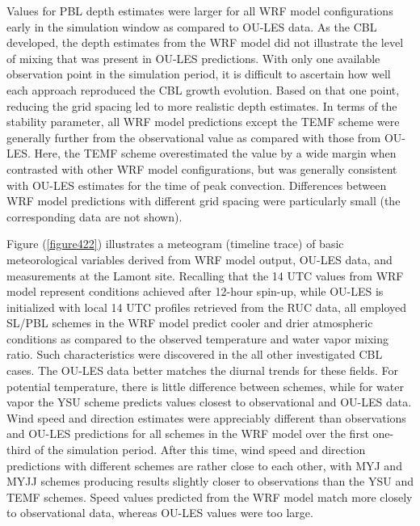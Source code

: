 Values for PBL depth estimates were larger for all WRF model configurations early in the simulation window as compared to OU-LES data. As the CBL developed, the depth estimates from the WRF model did not illustrate the level of mixing that was present in OU-LES predictions. With only one available observation point in the simulation period, it is difficult to ascertain how well each approach reproduced the CBL growth evolution. Based on that one point, reducing the grid spacing led to more realistic depth estimates. In terms of the stability parameter, all WRF model predictions except the TEMF scheme were generally further from the observational value as compared with those from OU-LES. Here, the TEMF scheme overestimated the value by a wide margin when contrasted with other WRF model configurations, but was generally consistent with OU-LES estimates for the time of peak convection. Differences between WRF model predictions with different grid spacing were particularly small (the corresponding data are not shown). 

Figure (\autoref{figure422}) illustrates a meteogram (timeline trace) of basic meteorological variables derived from WRF model output, OU-LES data, and measurements at the Lamont site. Recalling that the 14 UTC values from WRF model represent conditions achieved after 12-hour spin-up, while OU-LES is initialized with local 14 UTC profiles retrieved from the RUC data, all employed SL\slash PBL schemes in the WRF model predict cooler and drier atmospheric conditions as compared to the observed temperature and water vapor mixing ratio. Such characteristics were discovered in the all other investigated CBL cases. The OU-LES data better matches the diurnal trends for these fields. For potential temperature, there is little difference between schemes, while for water vapor the YSU scheme predicts values closest to observational and OU-LES data. Wind speed and direction estimates were appreciably different than observations and OU-LES predictions for all schemes in the WRF model over the first one-third of the simulation period. After this time, wind speed and direction predictions with different schemes are rather close to each other, with MYJ and MYJJ schemes producing results slightly closer to observations than the YSU and TEMF schemes. Speed values predicted from the WRF model match more closely to observational data, whereas OU-LES values were too large.


